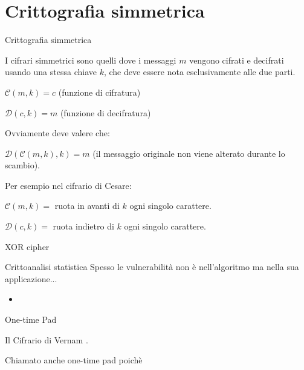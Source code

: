 \documentclass[xcolor=dvipsnames,aspectratio=169]{beamer}
\begin{document}
\part{Crittografia simmetrica}

\begin{frame}
	\partpage
	\centering
\end{frame}

\begin{frame}{Crittografia simmetrica}

  I cifrari simmetrici sono quelli dove i messaggi $m$ vengono cifrati e decifrati usando una stessa chiave $k$, che deve essere nota esclusivamente alle due parti.
  
  \medskip

  $\mathcal{C}(m, k) = c$ (funzione di cifratura)
    
  $\mathcal{D}(c, k) = m$ (funzione di decifratura)
  
  \medskip

  Ovviamente deve valere che:
  
  $\mathcal{D}(\mathcal{C}(m, k), k) = m$ (il messaggio originale non viene alterato durante lo scambio).
  
  \medskip
  
  Per esempio nel cifrario di Cesare:
  
  $\mathcal{C}(m, k) = $ ruota in avanti di $k$ ogni singolo carattere.
  
  $\mathcal{D}(c, k) = $ ruota indietro di $k$ ogni singolo carattere.
  
\end{frame}

\begin{frame}{XOR cipher}

\end{frame}

\begin{frame}{Crittoanalisi statistica}
  Spesso le vulnerabilità non è nell'algoritmo ma nella sua applicazione...
  
  \begin{itemize}
    \item 
  \end{itemize}
\end{frame}

\begin{frame}{One-time Pad}
  
  Il Cifrario di Vernam .
  
  Chiamato anche one-time pad poichè
  
\end{frame}
\end{document}

